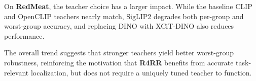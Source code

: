 \documentclass[10pt,twocolumn,letterpaper]{article}
\begin{document}
On \textbf{RedMeat}, the teacher choice has a larger impact. While the baseline CLIP and OpenCLIP teachers nearly match, SigLIP2 degrades both per-group and worst-group accuracy, and replacing DINO with XCiT-DINO also reduces performance.

The overall trend suggests that stronger teachers yield better worst-group robustness, reinforcing the motivation that \textbf{R4RR} benefits from accurate task-relevant localization, but does not require a uniquely tuned teacher to function.




\end{document}
